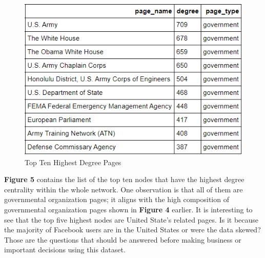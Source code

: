 \documentclass[11pt,twocolumn]{article}
\begin{document}
\begin{figure}[hbt!]
\includegraphics[scale=0.5]{top_ten_degree.png} 
\caption{Top Ten Highest Degree Pages}
\end{figure}

\textbf{Figure 5} contains the list of the top ten nodes that have the highest degree centrality within the whole network. One observation is that all of them are governmental organization pages; it aligns with the high composition of governmental organization pages shown in \textbf{Figure 4} earlier. It is interesting to see that the top five highest nodes are United State's related pages. Is it because the majority of Facebook users are in the United States or were the data skewed? Those are the questions that should be answered before making business or important decisions using this dataset.
\end{document}
